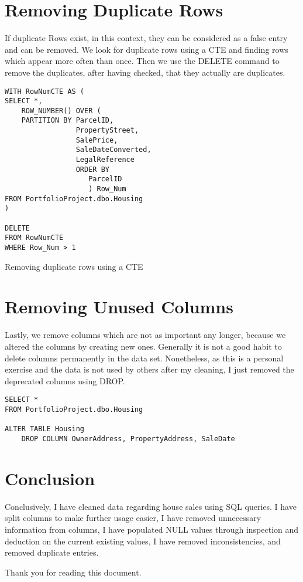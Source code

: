 \documentclass[11pt]{article}
\begin{document}
\section{Removing Duplicate Rows}
If duplicate Rows exist, in this context, they can be considered as a false entry and can be removed.
We look for duplicate rows using a CTE and finding rows which appear more often than once. Then we use the DELETE command to remove the duplicates, after having checked, that they actually are duplicates.

\begin{lstlisting}
WITH RowNumCTE AS (
SELECT *,
	ROW_NUMBER() OVER (
	PARTITION BY ParcelID,
				 PropertyStreet,
				 SalePrice,
				 SaleDateConverted,
				 LegalReference
				 ORDER BY 
					ParcelID
					) Row_Num
FROM PortfolioProject.dbo.Housing
)

DELETE
FROM RowNumCTE
WHERE Row_Num > 1
\end{lstlisting}
\caption{Removing duplicate rows using a CTE}

\section{Removing Unused Columns}
Lastly, we remove columns which are not as important any longer, because we altered the columns by creating new ones. Generally it is not a good habit to delete columns permanently in the data set. Nonetheless, as this is a personal exercise and the data is not used by others after my cleaning, I just removed the deprecated columns using DROP.

\begin{lstlisting}
SELECT *
FROM PortfolioProject.dbo.Housing

ALTER TABLE Housing
	DROP COLUMN OwnerAddress, PropertyAddress, SaleDate
\end{lstlisting}

\section{Conclusion}

Conclusively, I have cleaned data regarding house sales using SQL queries. I have split columns to make further usage easier, I have removed unnecessary information from columns, I have populated NULL values through inspection and deduction on the current existing values, I have removed inconsistencies, and removed duplicate entries.

Thank you for reading this document.
\end{document}
